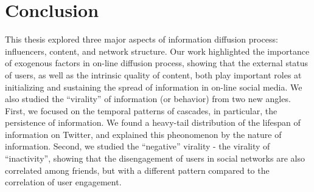 \documentclass[phd,tocprelim]{cornell}
\begin{document}
\chapter{Conclusion}
\label{chap:conclusion}

This thesis explored three major aspects of information diffusion process: influencers, content, and network structure. Our work highlighted the importance of exogenous factors in on-line diffusion process, showing that the external status of users, as well as the intrinsic quality of content, both play important roles at initializing and sustaining the spread of information in on-line social media. We also studied the ``virality'' of information (or behavior) from two new angles. First, we focused on the temporal patterns of cascades, in particular, the persistence of information. We found a heavy-tail distribution of the lifespan of information on Twitter, and explained this pheonomenon by the nature of information. Second, we studied the ``negative'' virality - the virality of ``inactivity'', showing that the disengagement of users in social networks are also correlated among friends, but with a different pattern compared to the correlation of user engagement. 
\end{document}
